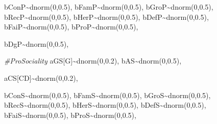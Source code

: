 \documentclass[
]{book}
\newenvironment{Shaded}{\begin{snugshade}}{\end{snugshade}}
\newcommand{\CommentTok}[1]{\textcolor[rgb]{0.56,0.35,0.01}{\textit{#1}}}
\newcommand{\DecValTok}[1]{\textcolor[rgb]{0.00,0.00,0.81}{#1}}
\newcommand{\FloatTok}[1]{\textcolor[rgb]{0.00,0.00,0.81}{#1}}
\newcommand{\FunctionTok}[1]{\textcolor[rgb]{0.00,0.00,0.00}{#1}}
\newcommand{\NormalTok}[1]{#1}
\newcommand{\SpecialCharTok}[1]{\textcolor[rgb]{0.00,0.00,0.00}{#1}}
\begin{document}
\begin{Shaded}
\begin{Highlighting}[]
\NormalTok{    bConP}\SpecialCharTok{\textasciitilde{}}\FunctionTok{dnorm}\NormalTok{(}\DecValTok{0}\NormalTok{,}\FloatTok{0.5}\NormalTok{),}
\NormalTok{    bFamP}\SpecialCharTok{\textasciitilde{}}\FunctionTok{dnorm}\NormalTok{(}\DecValTok{0}\NormalTok{,}\FloatTok{0.5}\NormalTok{),}
\NormalTok{    bGroP}\SpecialCharTok{\textasciitilde{}}\FunctionTok{dnorm}\NormalTok{(}\DecValTok{0}\NormalTok{,}\FloatTok{0.5}\NormalTok{),}
\NormalTok{    bRecP}\SpecialCharTok{\textasciitilde{}}\FunctionTok{dnorm}\NormalTok{(}\DecValTok{0}\NormalTok{,}\FloatTok{0.5}\NormalTok{),}
\NormalTok{    bHerP}\SpecialCharTok{\textasciitilde{}}\FunctionTok{dnorm}\NormalTok{(}\DecValTok{0}\NormalTok{,}\FloatTok{0.5}\NormalTok{),}
\NormalTok{    bDefP}\SpecialCharTok{\textasciitilde{}}\FunctionTok{dnorm}\NormalTok{(}\DecValTok{0}\NormalTok{,}\FloatTok{0.5}\NormalTok{),}
\NormalTok{    bFaiP}\SpecialCharTok{\textasciitilde{}}\FunctionTok{dnorm}\NormalTok{(}\DecValTok{0}\NormalTok{,}\FloatTok{0.5}\NormalTok{),}
\NormalTok{    bProP}\SpecialCharTok{\textasciitilde{}}\FunctionTok{dnorm}\NormalTok{(}\DecValTok{0}\NormalTok{,}\FloatTok{0.5}\NormalTok{),}
    
\NormalTok{    bDgP}\SpecialCharTok{\textasciitilde{}}\FunctionTok{dnorm}\NormalTok{(}\DecValTok{0}\NormalTok{,}\FloatTok{0.5}\NormalTok{),}
    
    \CommentTok{\#ProSociality}
\NormalTok{    aGS[G]}\SpecialCharTok{\textasciitilde{}}\FunctionTok{dnorm}\NormalTok{(}\DecValTok{0}\NormalTok{,}\FloatTok{0.2}\NormalTok{),}
\NormalTok{    bAS}\SpecialCharTok{\textasciitilde{}}\FunctionTok{dnorm}\NormalTok{(}\DecValTok{0}\NormalTok{,}\FloatTok{0.5}\NormalTok{),}
    
\NormalTok{    aCS[CD]}\SpecialCharTok{\textasciitilde{}}\FunctionTok{dnorm}\NormalTok{(}\DecValTok{0}\NormalTok{,}\FloatTok{0.2}\NormalTok{),}
    
\NormalTok{    bConS}\SpecialCharTok{\textasciitilde{}}\FunctionTok{dnorm}\NormalTok{(}\DecValTok{0}\NormalTok{,}\FloatTok{0.5}\NormalTok{),}
\NormalTok{    bFamS}\SpecialCharTok{\textasciitilde{}}\FunctionTok{dnorm}\NormalTok{(}\DecValTok{0}\NormalTok{,}\FloatTok{0.5}\NormalTok{),}
\NormalTok{    bGroS}\SpecialCharTok{\textasciitilde{}}\FunctionTok{dnorm}\NormalTok{(}\DecValTok{0}\NormalTok{,}\FloatTok{0.5}\NormalTok{),}
\NormalTok{    bRecS}\SpecialCharTok{\textasciitilde{}}\FunctionTok{dnorm}\NormalTok{(}\DecValTok{0}\NormalTok{,}\FloatTok{0.5}\NormalTok{),}
\NormalTok{    bHerS}\SpecialCharTok{\textasciitilde{}}\FunctionTok{dnorm}\NormalTok{(}\DecValTok{0}\NormalTok{,}\FloatTok{0.5}\NormalTok{),}
\NormalTok{    bDefS}\SpecialCharTok{\textasciitilde{}}\FunctionTok{dnorm}\NormalTok{(}\DecValTok{0}\NormalTok{,}\FloatTok{0.5}\NormalTok{),}
\NormalTok{    bFaiS}\SpecialCharTok{\textasciitilde{}}\FunctionTok{dnorm}\NormalTok{(}\DecValTok{0}\NormalTok{,}\FloatTok{0.5}\NormalTok{),}
\NormalTok{    bProS}\SpecialCharTok{\textasciitilde{}}\FunctionTok{dnorm}\NormalTok{(}\DecValTok{0}\NormalTok{,}\FloatTok{0.5}\NormalTok{),}
    

\end{Highlighting}
\end{Shaded}
\end{document}
